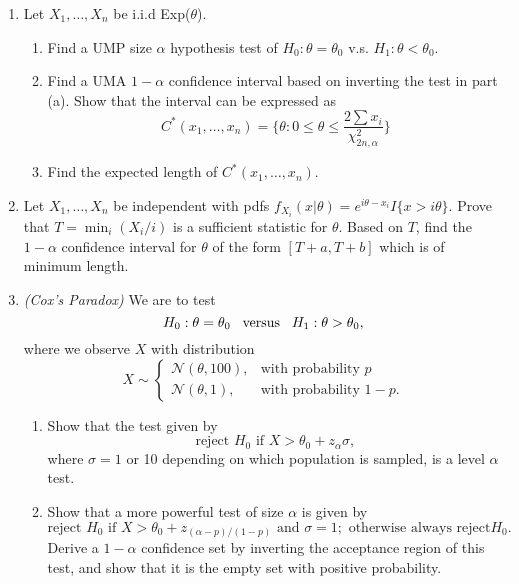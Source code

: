 \documentclass[12pt]{extarticle}
\begin{document}
\begin{enumerate}
	
	\item Let $X_1,\ldots, X_n$ be i.i.d Exp($\theta$). 
	\begin{enumerate}
		\item Find a UMP size $\alpha$ hypothesis test of $H_0: \theta = \theta_0$ v.s. $H_1: \theta < \theta_0$.
		\item Find a UMA $1 - \alpha$ confidence interval based on inverting the test in part (a). Show that the interval can be expressed as $$C^*(x_1,\ldots, x_n) = \Bigg\{\theta: 0\leq \theta\leq \dfrac{2\sum x_i}{\chi_{2n,\alpha}^2}\Bigg\}$$
		\item Find the expected length of $C^*(x_1,\ldots, x_n)$.
	\end{enumerate}
	\newpage
	\item Let $X_1,\ldots, X_n$ be independent with pdfs $f_{X_i}(x|\theta) = e^{i\theta-x_i}I\{x>i\theta\}$. Prove that $T = \min_i(X_i/i)$ is a sufficient statistic for $\theta$. Based on $T$, find the $1-\alpha$ confidence interval for $\theta$ of the form $[T+a,T+b]$ which is of minimum length. 
	\vspace{10cm}
	\item \textit{(Cox's Paradox)} We are to test $$H_0:\theta = \theta_0\hspace{3mm}\text{versus}\hspace{3mm} H_1:\theta>\theta_0,$$
	where we observe $X$ with distribution 
	$$X\sim \begin{cases}
		\mathcal N(\theta,100),& \text{with probability } p\\
		\mathcal N(\theta, 1),              & \text{with probability } 1-p.
	\end{cases}$$
	\begin{enumerate}
		\item Show that the test given by \[\text{reject }H_0 \text{ if }X>\theta_0+z_\alpha\sigma, \]
		where $\sigma = 1$ or 10 depending on which population is sampled, is a level $\alpha$ test.
		\item Show that a more powerful test of size $\alpha$ is given by 
		\[\text{reject }H_0 \text{ if }X>\theta_0+z_{(\alpha-p)/(1-p)} \text{ and }\sigma=1;\text{ otherwise always reject} H_0.\]
		Derive a $1-\alpha$ confidence set by inverting the acceptance region of this test, and show that it is the empty set with positive probability.
	\end{enumerate}
\end{enumerate}
\end{document}
